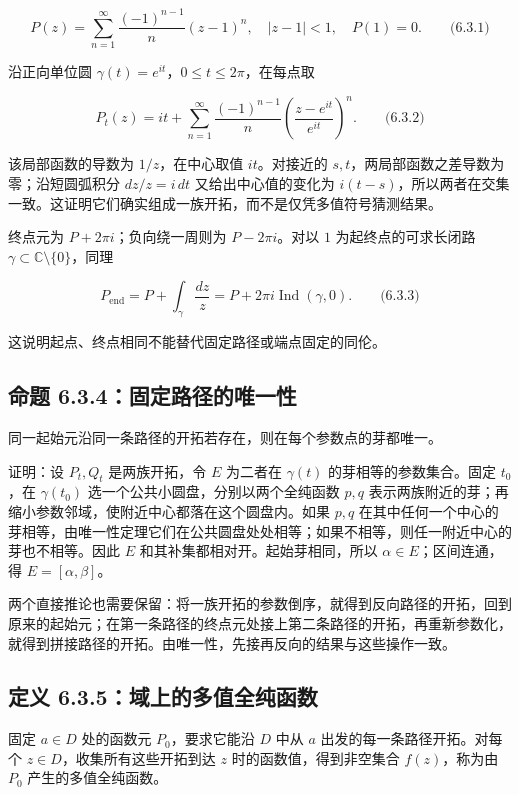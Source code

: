 \documentclass[11pt,a4paper]{article}
\begin{document}
\[
P(z)=\sum_{n=1}^{\infty}\frac{(-1)^{n-1}}n(z-1)^n,
\quad |z-1|<1,\quad P(1)=0.\qquad\text{(6.3.1)}
\]

沿正向单位圆 \(\gamma(t)=e^{it}\)，\(0\le t\le2\pi\)，在每点取

\[
P_t(z)=it+\sum_{n=1}^{\infty}\frac{(-1)^{n-1}}n
\left(\frac{z-e^{it}}{e^{it}}\right)^n.
\qquad\text{(6.3.2)}
\]

该局部函数的导数为 \(1/z\)，在中心取值 \(it\)。对接近的
\(s,t\)，两局部函数之差导数为零；沿短圆弧积分 \(dz/z=i\,dt\)
又给出中心值的变化为
\(i(t-s)\)，所以两者在交集一致。这证明它们确实组成一族开拓，而不是仅凭多值符号猜测结果。

终点元为 \(P+2\pi i\)；负向绕一周则为 \(P-2\pi i\)。对以 \(1\)
为起终点的可求长闭路 \(\gamma\subset\mathbb C\setminus\{0\}\)，同理

\[
P_{\mathrm{end}}=P+\int_\gamma\frac{dz}{z}
=P+2\pi i\operatorname{Ind}(\gamma,0).\qquad\text{(6.3.3)}
\]

这说明起点、终点相同不能替代固定路径或端点固定的同伦。

\subsection{命题 6.3.4：固定路径的唯一性}\label{ch06-s3-heading-4}

同一起始元沿同一条路径的开拓若存在，则在每个参数点的芽都唯一。

证明：设 \(P_t,Q_t\) 是两族开拓，令 \(E\) 为二者在 \(\gamma(t)\)
的芽相等的参数集合。固定 \(t_0\)，在 \(\gamma(t_0)\)
选一个公共小圆盘，分别以两个全纯函数 \(p,q\)
表示两族附近的芽；再缩小参数邻域，使附近中心都落在这个圆盘内。如果
\(p,q\)
在其中任何一个中心的芽相等，由唯一性定理它们在公共圆盘处处相等；如果不相等，则任一附近中心的芽也不相等。因此
\(E\) 和其补集都相对开。起始芽相同，所以 \(\alpha\in E\)；区间连通，得
\(E=[\alpha,\beta]\)。

两个直接推论也需要保留：将一族开拓的参数倒序，就得到反向路径的开拓，回到原来的起始元；在第一条路径的终点元处接上第二条路径的开拓，再重新参数化，就得到拼接路径的开拓。由唯一性，先接再反向的结果与这些操作一致。

\subsection{定义 6.3.5：域上的多值全纯函数}\label{ch06-s3-heading-5}

固定 \(a\in D\) 处的函数元 \(P_0\)，要求它能沿 \(D\) 中从 \(a\)
出发的每一条路径开拓。对每个 \(z\in D\)，收集所有这些开拓到达 \(z\)
时的函数值，得到非空集合 \(f(z)\)，称为由 \(P_0\) 产生的多值全纯函数。
\end{document}
